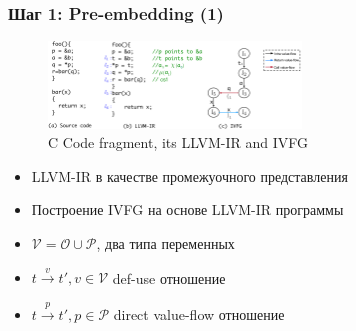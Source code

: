 \documentclass[xcolor=table,english]{beamer}
\begin{document}
\begin{frame}[fragile] \frametitle{Шаг 1: Pre-embedding (1)}
    \begin{minipage}[m]{\linewidth}
        \begin{figure}
            \centering
            \includegraphics[width=0.6\textwidth]{figures/llvm_ir_and_ivfg.png}
            \caption{C Code fragment, its LLVM-IR and IVFG}
            \label{fig:code_fragment}
        \end{figure}
    \end{minipage}\hfill
    \begin{minipage}[m]{\linewidth}
        \begin{itemize}
            \item LLVM-IR в качестве промежуочного представления
            \item Построение IVFG на основе LLVM-IR программы
            \item $\mathcal{V} = \mathcal{O} \cup \mathcal{P}$, два типа переменных
            \item $t \xrightarrow{v} t', v \in \mathcal{V}$ def-use отношение
            \item $t \xrightarrow{p} t', p \in \mathcal{P}$ direct value-flow отношение
        \end{itemize}
    \end{minipage}
\end{frame}
\end{document}
